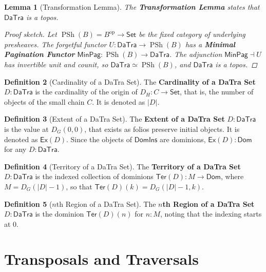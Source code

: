 \documentclass[11pt]{article}
\theoremstyle{definition}
\newtheorem{definition}{Definition}[section]
\theoremstyle{plain}
\newtheorem{lemma}[definition]{Lemma}
\newcommand{\Set}{\mathsf{Set}}
\newcommand{\PSh}{\operatorname{PSh}}
\begin{document}
\begin{lemma}[Transformation Lemma]
The \textbf{Transformation Lemma} states that $\mathsf{DaTra}$ is a topos.

\begin{proof}[Proof sketch]
Let $\PSh(B) = B^{\mathrm{op}} \to \Set$ be the fixed category of underlying
presheaves. The forgetful functor
$U : \mathsf{DaTra} \to \PSh(B)$ has a \textbf{Minimal Pagination Functor}
$\mathsf{MinPag} : \PSh(B) \to \mathsf{DaTra}$. The adjunction
$\mathsf{MinPag} \dashv U$ has invertible unit and counit, so
$\mathsf{DaTra} \simeq \PSh(B)$, and $\mathsf{DaTra}$ is a topos.
\end{proof}
\end{lemma}

\begin{definition}[Cardinality of a DaTra Set]
The \textbf{Cardinality of a DaTra Set} $D : \mathsf{DaTra}$ is the
cardinality of the origin of $D_H : C \to \Set$, that is, the number of
objects of the small chain $C$. It is denoted as $\lvert D\rvert$.
\end{definition}

\begin{definition}[Extent of a DaTra Set]
The \textbf{Extent of a DaTra Set} $D : \mathsf{DaTra}$ is the value at
$D_G(0,0)$, that exists as folios preserve initial objects. It is denoted as
$\mathsf{Ex}(D)$. Since the objects of $\mathsf{DomIns}$ are dominions,
$\mathsf{Ex}(D) : \mathsf{Dom}$ for any $D : \mathsf{DaTra}$.
\end{definition}

\begin{definition}[Territory of a DaTra Set]
The \textbf{Territory of a DaTra Set} $D : \mathsf{DaTra}$ is the indexed
collection of dominions $\mathsf{Ter}(D) : M \to \mathsf{Dom}$, where
$M = D_G(\lvert D\rvert - 1)$, so that
$\mathsf{Ter}(D)(k) = D_G(\lvert D\rvert - 1,k)$.
\end{definition}

\begin{definition}[$n$th Region of a DaTra Set]
The \textbf{$n$th Region of a DaTra Set} $D : \mathsf{DaTra}$ is the
dominion $\mathsf{Ter}(D)(n)$ for $n : M$, noting that the indexing starts at
$0$.
\end{definition}

\section{Transposals and Traversals}
\end{document}
